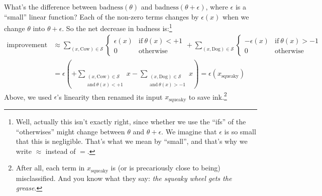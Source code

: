 \documentclass[openany, notitlepage, justified]{tufte-book}
\newcommand{\Ss}{\mathcal{S}}
\begin{document}
            What's the difference between
            $\text{badness}(\theta)$ and 
            $\text{badness}(\theta+\epsilon)$, where $\epsilon$ is a ``small''
            linear function?
            Each of the non-zero terms changes by
            $\epsilon(x)$ when we change $\theta$ into $\theta+\epsilon$.  
            So the net decrease in badness is:\footnote{
                Well, actually this isn't exactly right, since whether we use
                the ``ifs'' of the ``otherwises'' might change between $\theta$
                and $\theta + \epsilon$.  We imagine that $\epsilon$ is so
                small that this is negligible.  That's what we mean by ``small'',
                and that's why we write $\approx$ instead of $=$.
            }
            \begin{align*}
                \text{improvement}
                &\approx
                    \sum_{(x,\text{Cow})\in \Ss}
                    \begin{cases} 
                        \epsilon(x)      &       \text{if}~\theta(x) < +1 \\
                        0                &       \text{otherwise}
                    \end{cases}
                    +\sum_{(x,\text{Dog})\in \Ss}
                    \begin{cases} 
                        -\epsilon(x)     &       \text{if}~\theta(x) > -1\\
                        0                &       \text{otherwise}
                    \end{cases}
                    \\
                &=
                    \epsilon\left(
                        +
                        \sum_{\substack{(x,\text{Cow})\in \Ss \\ \text{and}~\theta(x)<+1}} x
                        -
                        \sum_{\substack{(x,\text{Dog})\in \Ss \\ \text{and}~\theta(x)>-1}} x
                    \right)
                = \epsilon(x_{\text{squeaky}})
            \end{align*}
            Above, we used $\epsilon$'s linearity then renamed its input
            $x_{\text{squeaky}}$ to save ink.\footnote{
                After all, each term in $x_{\text{squeaky}}$ is
                (or is precariously close to being) 
                misclassified.
                And you know what they say: \emph{the squeaky wheel gets the grease}.
            }
\end{document}
